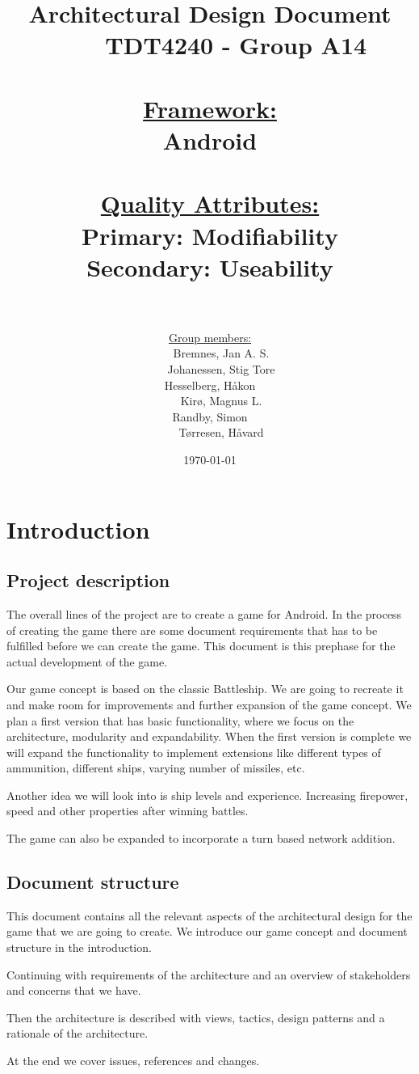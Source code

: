 \documentclass[12pt, a4paper]{article}
\title{
	Architectural Design Document \\
    TDT4240 - Group A14 \\
	\\
	\normalsize{
	\underline{Framework:} \\ 
	Android\\
    \\
	\underline{Quality Attributes:} \\
	Primary: Modifiability \\
	Secondary: Useability \\ 
    \\
	}
}
\author{
	\underline{Group members:} \\
    Bremnes, Jan A. S.\\
    Johanessen, Stig Tore\\
	Hesselberg, Håkon \\
    Kirø, Magnus L.\\
	Randby, Simon \\
    Tørresen, Håvard\\
}
\date{\today}
\begin{document}
\maketitle
{}

\newpage
\tableofcontents
\newpage

\section{Introduction}

\subsection{Project description}
The overall lines of the project are to create a game for Android. In the process of creating the game there are some document requirements that has to be fulfilled before we can create the game. This document is this prephase for the actual development of the game. 

Our game concept is based on the classic Battleship. We are going to recreate it and make room for improvements and further expansion of the game concept. We plan a first version that has basic functionality, where we focus on the architecture, modularity and expandability. When the first version is complete we will expand the functionality to implement extensions like different types of ammunition, different ships, varying number of missiles, etc. 

Another idea we will look into is ship levels and experience. Increasing firepower, speed and other properties after winning battles. 

The game can also be expanded to incorporate a turn based network addition. 

\subsection{Document structure}
This document contains all the relevant aspects of the architectural design for the game that we are going to create. We introduce our game concept and document structure in the introduction. 

Continuing with requirements of the architecture and an overview of stakeholders and concerns that we have. 

Then the architecture is described with views, tactics, design patterns and a rationale of the architecture.

At the end we cover issues, references and changes. 
\end{document}
